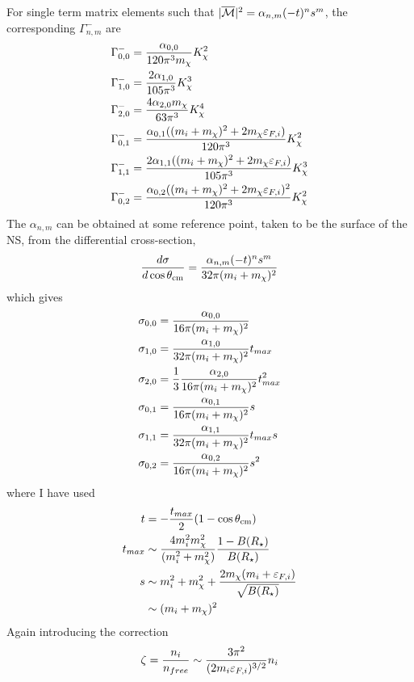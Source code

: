 For single term matrix elements such that $|\overline{\mathcal M}|^2 = \alpha_{n,m}(-t)^n s^m$, the corresponding $\Gamma_{n,m}^-$ are
\begin{align}
    \Gamma^-_{0,0} & = \frac{\alpha_{0,0}}{120\pi^3 m_\chi}K_\chi^2\\
    \Gamma^-_{1,0} & = \frac{2\alpha_{1,0}}{105\pi^3}K_\chi^3\\
    \Gamma^-_{2,0} & = \frac{4\alpha_{2,0}m_\chi}{63\pi^3}K_\chi^4\\
    \Gamma^-_{0,1} & = \frac{\alpha_{0,1}((m_i + m_\chi)^2 + 2m_\chi \varepsilon_{F,i})}{120\pi^3}K_\chi^2\\
    \Gamma^-_{1,1} & = \frac{2\alpha_{1,1}((m_i + m_\chi)^2 + 2m_\chi \varepsilon_{F,i})}{105\pi^3}K_\chi^3\\
    \Gamma^-_{0,2} & = \frac{\alpha_{0,2}((m_i + m_\chi)^2 + 2m_\chi \varepsilon_{F,i})^2}{120\pi^3}K_\chi^2
\end{align}
The $\alpha_{n,m}$ can be obtained at some reference point, taken to be the surface of the NS, from the differential cross-section,
\begin{equation}
    \frac{d \sigma }{d\cos\theta_\mathrm{cm}} = \frac{\alpha_{n,m}(-t)^n s^m}{32 \pi (m_i + m_\chi)^2}
\end{equation}
which gives
\begin{align}
    \sigma_{0,0} & = \frac{\alpha_{0,0}}{16 \pi (m_i + m_\chi)^2}\\
    \sigma_{1,0} & = \frac{\alpha_{1,0} }{32 \pi (m_i + m_\chi)^2}t_{max}\\
    \sigma_{2,0} & = \frac{1}{3}\frac{\alpha_{2,0} }{16 \pi (m_i + m_\chi)^2}t_{max}^2\\
    \sigma_{0,1} & = \frac{\alpha_{0,1}}{16 \pi (m_i + m_\chi)^2}s\\
    \sigma_{1,1} & = \frac{\alpha_{1,1} }{32 \pi (m_i + m_\chi)^2}t_{max}s\\
    \sigma_{0,2} & = \frac{\alpha_{0,2}}{16 \pi (m_i + m_\chi)^2}s^2
\end{align}
where I have used 
\begin{align}
    t & = -\frac{t_{max}}{2}(1 - \cos\theta_\mathrm{cm})\\
    t_{max} & \sim \frac{4 m_i^2 m_\chi^2}{(m_i^2 + m_\chi^2)}\frac{1 - B(R_\star)}{B(R_\star)}\\
    s & \sim m_i^2 + m_\chi^2 + \frac{2m_\chi (m_i +\varepsilon_{F,i})}{\sqrt{B(R_\star)}}\\
    &\sim (m_i +m_\chi)^2
\end{align}
Again introducing the correction 
\begin{equation}
    \zeta = \frac{n_i}{n_{free}} \sim \frac{3\pi^2}{(2m_i \varepsilon_{F,i})^{3/2}}n_i
\end{equation}
